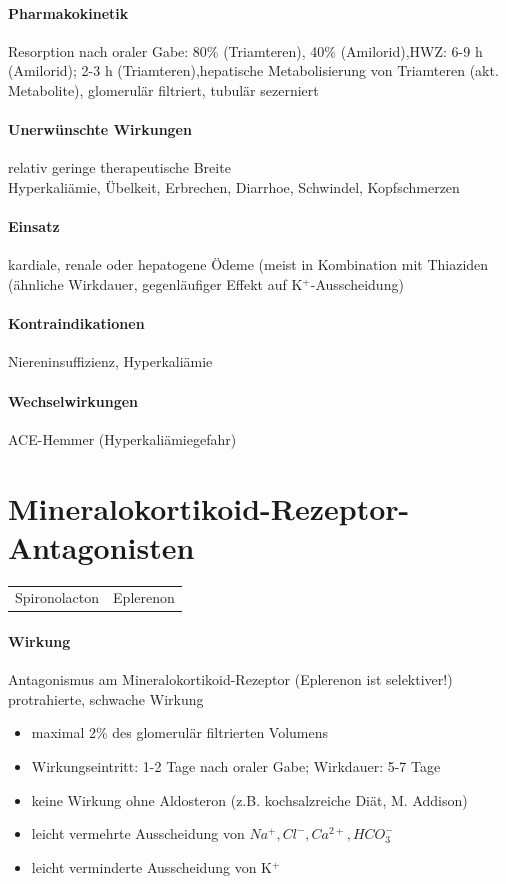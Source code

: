 \documentclass[10pt,a4paper]{report}
\begin{document}
\paragraph{Pharmakokinetik}Resorption nach oraler Gabe: 80\% (Triamteren), 40\% (Amilorid),HWZ: 6-9 h (Amilorid); 2-3 h (Triamteren),hepatische Metabolisierung von Triamteren (akt. Metabolite), glomerulär filtriert, tubulär sezerniert
\paragraph{Unerwünschte Wirkungen}relativ geringe therapeutische Breite\\
Hyperkaliämie, Übelkeit, Erbrechen, Diarrhoe, Schwindel, Kopfschmerzen
\paragraph{Einsatz}
kardiale, renale oder hepatogene Ödeme (meist in Kombination mit Thiaziden (ähnliche Wirkdauer, gegenläufiger Effekt auf K$^+$-Ausscheidung)
\paragraph{Kontraindikationen}Niereninsuffizienz, Hyperkaliämie
\paragraph{Wechselwirkungen}ACE-Hemmer (Hyperkaliämiegefahr)
\section{Mineralokortikoid-Rezeptor-Antagonisten}
\begin{tabularx}{\textwidth}{XX}
Spironolacton&Eplerenon\\
\end{tabularx}
\paragraph{Wirkung}
Antagonismus am Mineralokortikoid-Rezeptor (Eplerenon ist selektiver!) protrahierte, schwache Wirkung
\begin{itemize}
	\item maximal 2\% des glomerulär filtrierten Volumens
	\item Wirkungseintritt: 1-2 Tage nach oraler Gabe; Wirkdauer: 5-7 Tage
	\item keine Wirkung ohne Aldosteron (z.B. kochsalzreiche Diät, M. Addison)
	\item leicht vermehrte Ausscheidung von $Na^+, Cl^-, Ca^{2+}, HCO_3^-$ 
	\item leicht verminderte Ausscheidung von K$^+$
\end{itemize}
\end{document}
